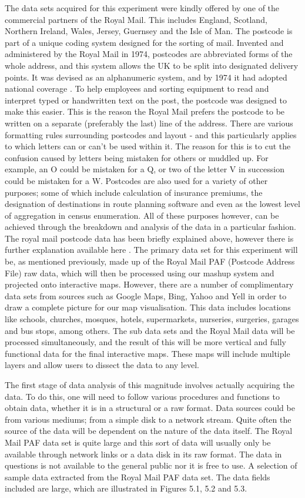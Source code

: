 The data sets acquired for this experiment were kindly offered by one of the commercial partners of the Royal Mail. This includes England, Scotland, Northern Ireland, Wales, Jersey, Guernsey and the Isle of Man. The postcode is part of a unique coding system designed for the sorting of mail. Invented and administered by the Royal Mail in 1974, postcodes are abbreviated forms of the whole address, and this system allows the UK to be split into designated delivery points. It was devised as an alphanumeric system, and by 1974 it had adopted national coverage \cite{mail1997postcode}. To help employees and sorting equipment to read and interpret typed or handwritten text on the post, the postcode was designed to make this easier. This is the reason the Royal Mail prefers the postcode to be written on a separate (preferably the last) line of the address. There are various formatting rules surrounding postcodes and layout - and this particularly applies to which letters can or can't be used within it. The reason for this is to cut the confusion caused by letters being mistaken for others or muddled up. For example, an O could be mistaken for a Q, or two of the letter V in succession could be mistaken for a W. Postcodes are also used for a variety of other purposes; some of which include calculation of insurance premiums, the designation of destinations in route planning software and even as the lowest level of aggregation in census enumeration. All of these purposes however, can be achieved through the breakdown and analysis of the data in a particular fashion. The royal mail postcode data has been briefly explained above, however there is further explanation available here \cite{royalmail}. The primary data set for this experiment will be, as mentioned previously, made up of the Royal Mail PAF (Postcode Address File) raw data, which will then be processed using our mashup system and projected onto interactive maps. However, there are a number of complimentary data sets from sources such as Google Maps, Bing, Yahoo and Yell in order to draw a complete picture for our map visualisation. This data includes locations like schools, churches, mosques, hotels, supermarkets, nurseries, surgeries, garages and bus stops, among others. The sub data sets and the Royal Mail data will be processed simultaneously, and the result of this will be more vertical and fully functional data for the final interactive maps. These maps will include multiple layers and allow users to dissect the data to any level.

The first stage of data analysis of this magnitude involves actually acquiring the data. To do this, one will need to follow various procedures and functions to obtain data, whether it is in a structural or a raw format. Data sources could be from various mediums; from a simple disk to a network stream. Quite often the source of the data will be dependent on the nature of the data itself. The Royal Mail PAF data set is quite large and this sort of data will usually only be available through network links or a data disk in its raw format. The data in questions is not available to the general public nor it is free to use. A selection of sample data extracted from the Royal Mail PAF data set. The data fields included are large, which are illustrated in Figures 5.1, 5.2 and 5.3.

